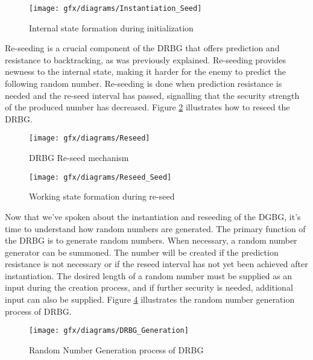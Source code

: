 \begin{figure}[htbp]
	\centering
	\texttt{[image: gfx/diagrams/Instantiation\_Seed]}
	\caption{Internal state formation during initialization}
	\label{fig:2:12}
\end{figure}

Re-seeding is a crucial component of the DRBG that offers prediction and resistance to backtracking, as was previously explained. Re-seeding provides newness to the internal state, making it harder for the enemy to predict the following random number. Re-seeding is done when prediction resistance is needed and the re-seed interval has passed, signalling that the security strength of the produced number has decreased. Figure \ref{fig:2:13} illustrates how to reseed the DRBG.
\begin{figure}[htbp]
	\centering
	\texttt{[image: gfx/diagrams/Reseed]}
	\caption{DRBG Re-seed mechanism}
	\label{fig:2:13}
\end{figure}
\begin{figure}[htbp]
	\centering
	\texttt{[image: gfx/diagrams/Reseed\_Seed]}
	\caption{Working state formation during re-seed}
	\label{fig:2:14}
\end{figure}

Now that we've spoken about the instantiation and reseeding of the DGBG, it's time to understand how random numbers are generated. The primary function of the DRBG is to generate random numbers. When necessary, a random number generator can be summoned. The number will be created if the prediction resistance is not necessary or if the reseed interval has not yet been achieved after instantiation. The desired length of a random number must be supplied as an input during the creation process, and if further security is needed, additional input can also be supplied. Figure \ref{fig:2:15} illustrates the random number generation process of DRBG.

\begin{figure}[htbp]
	\centering
	\texttt{[image: gfx/diagrams/DRBG\_Generation]}
	\caption{Random Number Generation process of DRBG}
	\label{fig:2:15}
\end{figure}

%
%
